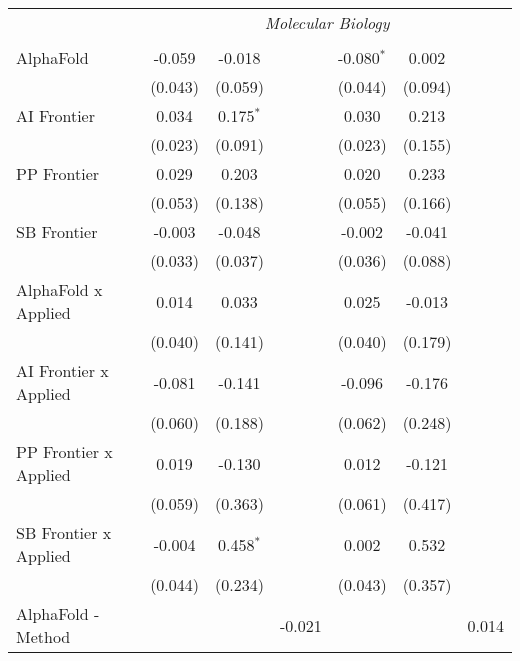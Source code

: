 \begin{tabular}{lcccccc}
 & \multicolumn{6}{c}{\textit{Molecular Biology}} \\ \\
   AlphaFold                      & -0.059  & -0.018      &                & -0.080$^{*}$ & 0.002   &   \\   
                                  & (0.043) & (0.059)     &                & (0.044)      & (0.094) &   \\   
   AI Frontier                    & 0.034   & 0.175$^{*}$ &                & 0.030        & 0.213   &   \\   
                                  & (0.023) & (0.091)     &                & (0.023)      & (0.155) &   \\   
   PP Frontier                    & 0.029   & 0.203       &                & 0.020        & 0.233   &   \\   
                                  & (0.053) & (0.138)     &                & (0.055)      & (0.166) &   \\   
   SB Frontier                    & -0.003  & -0.048      &                & -0.002       & -0.041  &   \\   
                                  & (0.033) & (0.037)     &                & (0.036)      & (0.088) &   \\   
   AlphaFold x Applied            & 0.014   & 0.033       &                & 0.025        & -0.013  &   \\   
                                  & (0.040) & (0.141)     &                & (0.040)      & (0.179) &   \\   
   AI Frontier x Applied          & -0.081  & -0.141      &                & -0.096       & -0.176  &   \\   
                                  & (0.060) & (0.188)     &                & (0.062)      & (0.248) &   \\   
   PP Frontier x Applied          & 0.019   & -0.130      &                & 0.012        & -0.121  &   \\   
                                  & (0.059) & (0.363)     &                & (0.061)      & (0.417) &   \\   
   SB Frontier x Applied          & -0.004  & 0.458$^{*}$ &                & 0.002        & 0.532   &   \\   
                                  & (0.044) & (0.234)     &                & (0.043)      & (0.357) &   \\   
   AlphaFold - Method             &         &             & -0.021         &              &         & 0.014\\   

\end{tabular}
